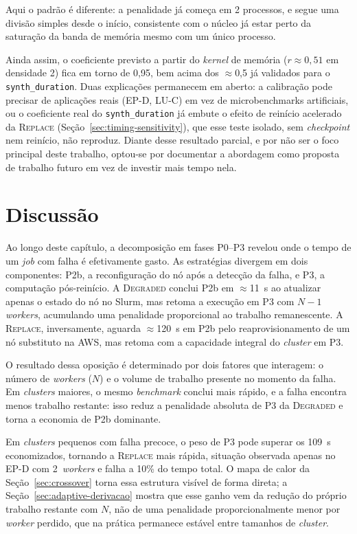 Aqui o padrão é diferente: a penalidade já começa em 2 processos, e segue uma
divisão simples desde o início, consistente com o núcleo já estar perto da
saturação da banda de memória mesmo com um único processo.

Ainda assim, o coeficiente previsto a partir do \textit{kernel} de memória
($r\approx0,51$ em densidade 2) fica em torno de 0,95, bem acima dos
$\approx$0,5 já validados para o \texttt{synth\_duration}. Duas explicações
permanecem em aberto: a calibração pode precisar de aplicações reais (EP-D,
LU-C) em vez de microbenchmarks artificiais, ou o coeficiente real do
\texttt{synth\_duration} já embute o efeito de reinício acelerado da
\textsc{Replace} (Seção~\ref{sec:timing-sensitivity}), que esse teste isolado,
sem \textit{checkpoint} nem reinício, não reproduz. Diante desse resultado
parcial, e por não ser o foco principal deste trabalho, optou-se por documentar
a abordagem como proposta de trabalho futuro em vez de investir mais tempo nela.


\section{Discussão}
\label{sec:discussao}

Ao longo deste capítulo, a decomposição em fases P0--P3 revelou onde o tempo de
um \textit{job} com falha é efetivamente gasto. As estratégias divergem em dois
componentes: P2b, a reconfiguração do nó após a detecção da falha, e P3, a
computação pós-reinício. A \textsc{Degraded} conclui P2b em $\approx$11~s ao
atualizar apenas o estado do nó no Slurm, mas retoma a execução em P3 com
$N{-}1$ \textit{workers}, acumulando uma penalidade proporcional ao trabalho
remanescente. A \textsc{Replace}, inversamente, aguarda $\approx$120~s em P2b
pelo reaprovisionamento de um nó substituto na AWS, mas retoma com a capacidade
integral do \textit{cluster} em P3.

O resultado dessa oposição é determinado por dois fatores que interagem: o
número de \textit{workers} ($N$) e o volume de trabalho presente no momento da
falha. Em \textit{clusters} maiores, o mesmo \textit{benchmark} conclui mais
rápido, e a falha encontra menos trabalho restante: isso reduz a penalidade
absoluta de P3 da \textsc{Degraded} e torna a economia de P2b dominante.

Em \textit{clusters} pequenos com falha precoce, o peso de P3 pode superar os
109~s economizados, tornando a \textsc{Replace} mais rápida, situação observada
apenas no EP-D com 2~\textit{workers} e falha a 10\% do tempo total. O mapa de
calor da Seção~\ref{sec:crossover} torna essa estrutura visível de forma
direta; a Seção~\ref{sec:adaptive-derivacao} mostra que esse ganho vem da
redução do próprio trabalho restante com $N$, não de uma penalidade
proporcionalmente menor por \textit{worker} perdido, que na prática permanece
estável entre tamanhos de \textit{cluster}.

